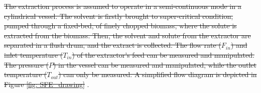 \documentclass[../Parameter_fitting.tex]{subfiles}
\begin{document}
	\sout{The extraction process is assumed to operate in a semi-continuous mode in a cylindrical vessel. The solvent is firstly brought to super-critical condition, pumped through a fixed-bed, of finely chopped biomass, where the solute is extracted from the biomass. Then, the solvent and solute from the extractor are separated in a flush drum, and the extract is collected. The flow rate ($F_{in}$) and inlet temperature ($T_{in}$) of the extractor’s feed can be measured and manipulated. The pressure ($P$) in the vessel can be measured and manipulated, while the outlet temperature ($T_{out}$) can only be measured. A simplified flow diagram is depicted in Figure \ref{fig: SFE_drawing} }.
	
	
\end{document}
